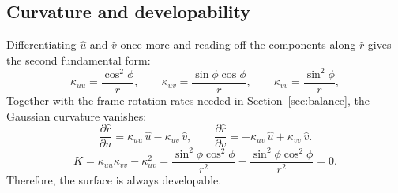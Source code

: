 \documentclass[11pt]{article}
\begin{document}
\subsection{Curvature and developability}\label{sec:developable}
Differentiating $\hat u$ and $\hat v$ once more and reading off the components
along $\hat r$ gives the second fundamental form:
\begin{equation}\label{eq:curvatures}
    \boxed{\;\kappa_{uu} = \frac{\cos^{2}\phi}{r}, \qquad
    \kappa_{uv} = \frac{\sin\phi\cos\phi}{r}, \qquad
    \kappa_{vv} = \frac{\sin^{2}\phi}{r},\;}
\end{equation}
Together with the frame-rotation rates needed in Section~\ref{sec:balance}, the Gaussian curvature vanishes:
\begin{equation}\label{eq:frame_rates}
    \frac{\partial \hat r}{\partial u} = \kappa_{uu}\,\hat u - \kappa_{uv}\,\hat v,
    \qquad
    \frac{\partial \hat r}{\partial v} = -\kappa_{uv}\,\hat u
      + \kappa_{vv}\,\hat v.
\end{equation}
\begin{equation}\label{eq:K_zero}
    \boxed{\;K = \kappa_{uu}\kappa_{vv} - \kappa_{uv}^{2}
    = \frac{\sin^{2}\phi\cos^{2}\phi}{r^{2}}
      - \frac{\sin^{2}\phi\cos^{2}\phi}{r^{2}} = 0.\;}
\end{equation}
Therefore, the surface is always developable.
\end{document}
